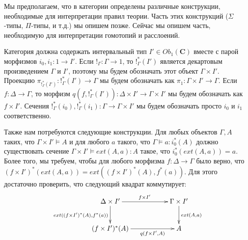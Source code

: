 \documentclass{amsart}
\makeatletter
\theoremstyle{definition}
\theoremstyle{remark}
\newcommand{\cat}[1]{\mathbf{#1}}
\renewcommand{\C}{\cat{C}}
\newcommand{\po}[1][dr]{\save*!/#1+1.2pc/#1:(1,-1)@^{|-}\restore}
\numberwithin{figure}{section}
\makeatother
\begin{document}
Мы предполагаем, что в категории определены различные конструкции, необходимые для интерпретации правил теории.
Часть этих конструкций ($\Sigma$-типы, $\Pi$-типы, и т.д.) мы опишем позже.
Сейчас мы опишем часть, необходимую для интерпретации гомотопий и расслоений.

Категория должна содержать интервальный тип $I' \in Ob_1(\C)$ вместе с парой морфизмов $i_0, i_1 : 1 \to I'$.
Если $!_\Gamma : \Gamma \to 1$, то $!_\Gamma^*(I')$ является декартовым произведением $\Gamma$ и $I'$, поэтому мы будем обозначать этот объект $\Gamma \times I'$.
Проекцию $\pi_{!_\Gamma^*(I')} : !_\Gamma^*(I') \to \Gamma$ мы будем обозначать как $\pi_1 : \Gamma \times I' \to \Gamma$.
Если $f : \Delta \to \Gamma$, то морфизм $q(f, !_\Gamma^*(I')) : \Delta \times I' \to \Gamma \times I'$ мы будем обозначать как $f \times I'$.
Сечения $!_\Gamma^*(i_0), !_\Gamma^*(i_1) : \Gamma \to \Gamma \times I'$ мы будем обозначать просто $i_0$ и $i_1$ соответственно.

\begin{comment}
Также в категории должен быть выбран насыщенный класс морфизмов, которые мы называем \emph{тривиальными корасслоениями}.
Морфизмы, которые имеют правое свойство поднятия по отношению к тривиальным корасслоениям, мы называем \emph{расслоениями}.
Мы требуем, чтобы для любого $\Gamma \models A$ морфизмы $\pi_A : \Gamma.A \to \Gamma$ являлись расслоениями.

Тривиальные корасслоения должны содержать морфизмы вида $i_0 : \Gamma \to \Gamma \times I'$ и
    $(\Gamma \times I' \amalg \Gamma \times I') \amalg_{\Gamma \amalg \Gamma} \Gamma \times I' \to \Gamma \times I' \times I'$, которые определяются как в следующей диаграмме:
\[ \xymatrix@-1pc{ \Gamma \amalg \Gamma \ar[rr]^{i_0 \amalg i_0} \ar[dd]_{[i_0, i_1]} & & \Gamma \times I' \amalg \Gamma \times I' \ar[dd] \ar[rddd]^{[i_0, i_1]} \\ \\
\Gamma \times I' \ar[rr] \ar[rrrd]_{i_0 \times id_{I'}} & & \po (\Gamma \times I' \amalg \Gamma \times I') \amalg_{\Gamma \amalg \Gamma} \Gamma \times I' \ar@{-->}[rd] \\
                                                                       & & & \Gamma \times I' \times I'
                 } \]
\end{comment}

Также нам потребуются следующие конструкции.
Для любых объектов $\Gamma, A$ таких, что $\Gamma \times I' \models A$ и для любого $a$ такого, что $\Gamma \models a : i_0^*(A)$ должно существовать сечение $\Gamma \times I' \models ext(A, a) : A$ такое, что $i_0^*(ext(A, a)) = a$.
Более того, мы требуем, чтобы для любого морфизма $f : \Delta \to \Gamma$ было верно, что $(f \times I')^*(ext(A, a)) = ext((f \times I')^*(A), f^*(a))$.
Для этого достаточно проверить, что следующий квадрат коммутирует:
\[ \xymatrix{ \Delta \times I' \ar[rr]^{f \times I'} \ar[d]_{ext((f \times I')^*(A), f^*(a))} & & \Gamma \times I' \ar[d]^{ext(A,a)} \\
              (f \times I')^*(A) \ar[rr]_-{q(f \times I', A)}                                 & & A
            } \]
\end{document}
